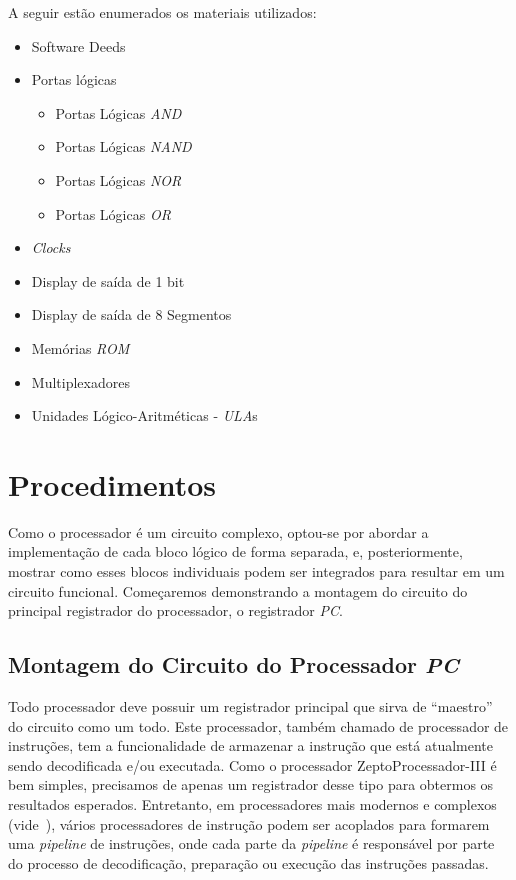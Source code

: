 \documentclass[12pt]{article}
\begin{document}
A seguir estão enumerados os materiais utilizados:
\begin{itemize}
    \item Software Deeds
    \item Portas lógicas
    \begin{itemize}
      \item Portas Lógicas \emph{AND}
      \item Portas Lógicas \emph{NAND}
      \item Portas Lógicas \emph{NOR}
      \item Portas Lógicas \emph{OR}
    \end{itemize}
    \item \emph{Clocks}
    \item Display de saída de 1 bit
    \item Display de saída de 8 Segmentos
    \item Memórias \emph{ROM}
    \item Multiplexadores
    \item Unidades Lógico-Aritméticas - \emph{ULA}s
\end{itemize}

\section{Procedimentos}\label{sec:Procedimentos}

Como o processador é um circuito complexo, optou-se por abordar a implementação
de cada bloco lógico de forma separada, e, posteriormente, mostrar como esses
blocos individuais podem ser integrados para resultar em um circuito funcional.
Começaremos demonstrando a montagem do circuito do principal registrador do
processador, o registrador \emph{PC}.

\subsection{Montagem do Circuito do Processador \emph{PC}}\label{sec:2.1}

Todo processador deve possuir um registrador principal que sirva de ``maestro''
do circuito como um todo. Este processador, também chamado de processador de
instruções, tem a funcionalidade de armazenar a instrução que está atualmente
sendo decodificada e/ou executada. Como o processador ZeptoProcessador-III é bem
simples, precisamos de apenas um registrador desse tipo para obtermos os
resultados esperados. Entretanto, em processadores mais modernos e complexos
(vide~\cite{Instruction_register}), vários processadores de instrução podem ser
acoplados para formarem uma \emph{pipeline} de instruções, onde cada parte da
\emph{pipeline} é responsável por parte do processo de decodificação, preparação
ou execução das instruções passadas.
\end{document}
